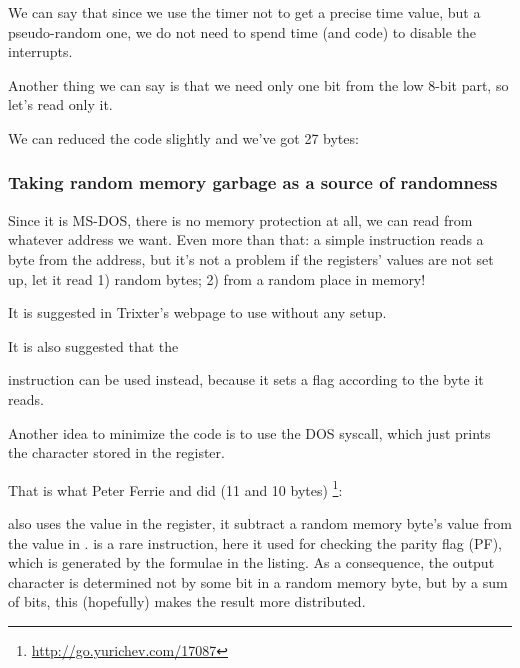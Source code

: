 We can say that since we use the timer not 
to get a precise time value, but a pseudo-random one, we do not need
to spend time (and code) to disable the interrupts.

Another thing we can say is that we need only one bit from the low 8-bit part, so let's read only it.

We can reduced the code slightly and we've got 27 bytes:



\subsubsection{
Taking random memory garbage as a source of randomness}

Since it is MS-DOS, there is no memory protection at all, we can read from whatever address we want.
Even more than that: a simple  
instruction reads a byte from the  address, but it's not a problem
if the registers' values are not set up, let it read 1) random bytes; 2) from a random place in memory!

It is suggested in Trixter's webpage\FNURLTRIXTER 
to use  without any setup.

It is also suggested that the  

instruction can be used instead, because it sets a flag according to the byte it reads.


Another idea to minimize the code is to use the  DOS syscall, which just prints the character stored in the  register.

That is what Peter Ferrie and \HERMIT{} did (11 and 10 bytes)
\footnote{\url{http://go.yurichev.com/17087}}:



 also uses the value in the 
 register, it subtract a random memory byte's value from the  value in .
 is a rare instruction, here it used for checking the parity flag (PF), 
which is generated by the formulae in the listing.
As a consequence, the output character 
is determined not by some bit in a random memory byte, but by a sum of bits, 
this (hopefully) makes the result more distributed.

